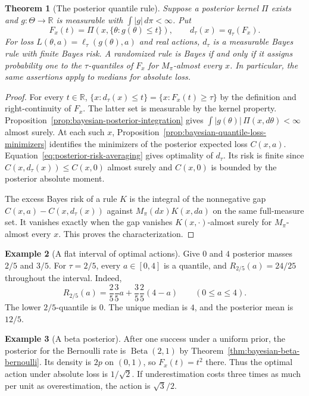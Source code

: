 \documentclass[11pt,oneside]{book}
\newtheorem{theorem}{Theorem}[chapter]
\theoremstyle{definition}
\newtheorem{example}[theorem]{Example}
\theoremstyle{remark}
\newcommand{\R}{\mathbb R}
\begin{document}
\begin{theorem}[The posterior quantile rule]
\label{thm:bayesian-posterior-quantile-rule}
Suppose a posterior kernel $\Pi$ exists and $g:\Theta\to\R$ is
measurable with $\int |g|\,d\pi<\infty$. Put
\[
F_x(t)=\Pi(x,\{\theta:g(\theta)\leq t\}),\qquad
d_\tau(x)=q_\tau(F_x).
\]
For loss $L(\theta,a)=\ell_\tau(g(\theta),a)$ and real actions,
$d_\tau$ is a measurable Bayes rule with finite Bayes risk.
A randomized rule is Bayes if and only if it assigns probability
one to the $\tau$-quantiles of $F_x$ for $M_\pi$-almost every $x$.
In particular, the same assertions apply to medians for absolute loss.
\end{theorem}
\begin{proof}
For every $t\in\R$, $\{x:d_\tau(x)\leq t\}=\{x:F_x(t)\geq\tau\}$
by the definition and right-continuity of $F_x$. The latter set
is measurable by the kernel property. Proposition~\ref{prop:bayesian-posterior-integration}
gives $\int |g(\theta)|\,\Pi(x,d\theta)<\infty$ almost surely.
At each such $x$, Proposition~\ref{prop:bayesian-quantile-loss-minimizers}
identifies the minimizers of the posterior expected loss $C(x,a)$.
Equation~\eqref{eq:posterior-risk-averaging} gives optimality
of $d_\tau$. Its risk is finite since $C(x,d_\tau(x))\leq C(x,0)$
almost surely and $C(x,0)$ is bounded by the posterior absolute moment.

The excess Bayes risk of a rule $K$ is the integral of the
nonnegative gap $C(x,a)-C(x,d_\tau(x))$ against
$M_\pi(dx)K(x,da)$ on the same full-measure set. It vanishes
exactly when the gap vanishes $K(x,\cdot)$-almost surely for
$M_\pi$-almost every $x$. This proves the characterization.
\end{proof}

\begin{example}[A flat interval of optimal actions]
\label{ex:bayesian-quantile-flat-interval}
Give $0$ and $4$ posterior masses $2/5$ and $3/5$.
For $\tau=2/5$, every $a\in[0,4]$ is a quantile, and
$R_{2/5}(a)=24/25$ throughout the interval. Indeed,
\[
R_{2/5}(a)=\frac25\frac35 a+\frac35\frac25(4-a)
\qquad(0\leq a\leq4).
\]
The lower $2/5$-quantile is $0$. The unique median is $4$,
and the posterior mean is $12/5$.
\end{example}

\begin{example}[A beta posterior]
\label{ex:bayesian-quantile-beta}
After one success under a uniform prior, the posterior for the
Bernoulli rate is $\operatorname{Beta}(2,1)$ by
Theorem~\ref{thm:bayesian-beta-bernoulli}. Its density is $2p$ on
$(0,1)$, so $F_x(t)=t^2$ there. Thus the optimal action under
absolute loss is $1/\sqrt2$. If underestimation costs three
times as much per unit as overestimation, the action is
$\sqrt{3}/2$.
\end{example}
\end{document}

